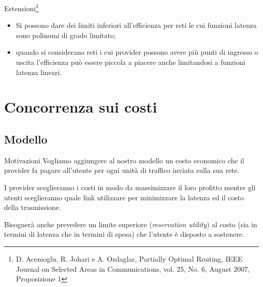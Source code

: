 \documentclass{beamer}
\theoremstyle{plain}
\theoremstyle{definition}
\theoremstyle{remark}
\begin{document}
\begin{frame}{Estensioni\footnote{D. Acemoglu, R. Johari e
      A. Ozdaglar, Partially Optimal Routing, IEEE Journal on Selected
      Areas in Communications, vol. 25, No. 6, August 2007,
      Proposizione 1}}
  \begin{itemize}
  \item Si possono dare dei limiti inferiori all'efficienza per reti
    le cui funzioni latenza sono polinomi di grado limitato;
  \item quando si considerano reti i cui provider possono avere più
    punti di ingresso o uscita l'efficienza può essere piccola a
    piacere anche limitandosi a funzioni latenza lineari.
  \end{itemize}
\end{frame}

\section{Concorrenza sui costi}

\subsection{Modello}

\begin{frame}{Motivazioni}
  Vogliamo aggiungere al nostro modello un costo economico che il
  provider fa pagare all'utente per ogni unità di traffico inviata
  sulla sua rete.

  I provider sceglieranno i costi in modo da massimizzare il loro
  profitto mentre gli utenti sceglieranno quale link utilizzare per
  minimizzare la latenza ed il costo della trasmissione.

  Bisognerà anche prevedere un limite superiore (\textit{reservation
    utility}) al costo (sia in termini di latenza che in termini di
  spesa) che l'utente è disposto a sostenere.
\end{frame}
\end{document}

